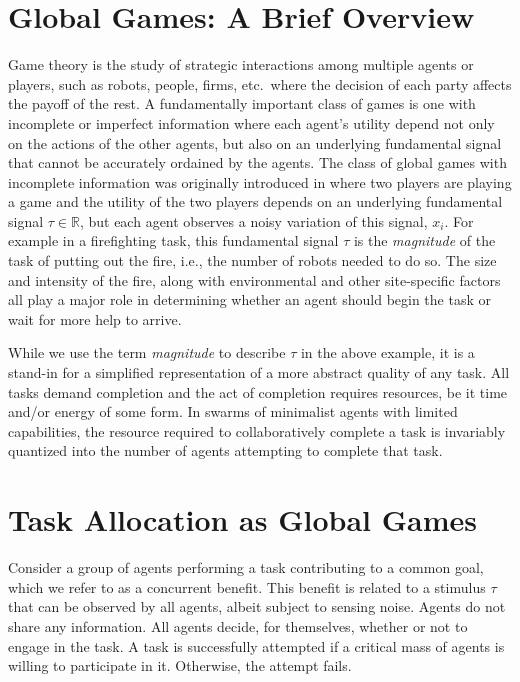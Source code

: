 \documentclass[smallextended]{svjour3}       %
\begin{document}
\section{Global Games: A Brief Overview}\label{sec:ggoverview}
Game theory is the study of strategic interactions among multiple agents or players, such as robots, people, firms, etc.\ where the decision of each party affects the payoff of the rest. A fundamentally important class of games is one with incomplete or imperfect information where each agent's utility depend not only on the actions of the other agents, but also on an underlying fundamental signal that cannot be accurately ordained by the agents. The class of global games with incomplete information was originally introduced in \cite{Carlsson1993} where two players are playing a game and the utility of the two players depends on an underlying fundamental signal $\tau \in \mathbb{R}$, but each agent observes a noisy variation of this signal, $x_i$. For example in a firefighting task, this fundamental signal $\tau$ is the \emph{magnitude} of the task of putting out the fire, i.e., the number of robots needed to do so. The size and intensity of the fire, along with environmental and other site-specific factors all play a major role in determining whether an agent should begin the task or wait for more help to arrive.

While we use the term \emph{magnitude} to describe $\tau$ in the above example, it is a stand-in for a simplified representation of a more abstract quality of any task. All tasks demand completion and the act of completion requires resources, be it time and/or energy of some form. In swarms of minimalist agents with limited capabilities, the resource required to collaboratively complete a task is invariably quantized into the number of agents attempting to complete that task.

\section{Task Allocation as Global Games}\label{sec:globalgame}
Consider a group of agents performing a task contributing to a common goal, which we refer to as a concurrent benefit. This benefit is related to a stimulus $\tau$ that can be observed by all agents, albeit subject to sensing noise. Agents do not share any information. All agents decide, for themselves, whether or not to engage in the task. A task is successfully attempted if a critical mass of agents is willing to participate in it. Otherwise, the attempt fails.
\end{document}
